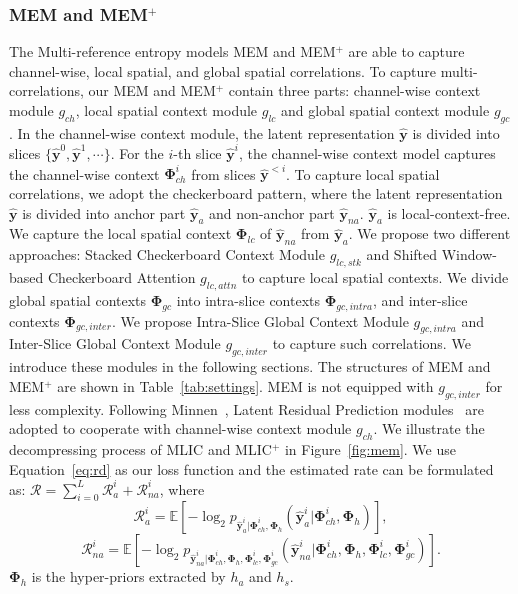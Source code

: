 \documentclass[sigconf]{acmart}
\begin{document}
\subsubsection{MEM and MEM$^+$}
The Multi-reference entropy models MEM and MEM$^+$ are able to
capture channel-wise, local spatial, and global spatial correlations.
To capture multi-correlations, our MEM and MEM$^+$ contain three parts:
channel-wise context module $g_{ch}$, local spatial context module $g_{lc}$ and
global spatial context module $g_{gc}$.
In the channel-wise context module, the latent representation $\hat{\boldsymbol{y}}$
is divided into slices $\{\hat {\boldsymbol{y}}^0, \hat {\boldsymbol{y}}^1, \cdots\}$.
For the $i$-th slice $\hat {\boldsymbol{y}}^i$, the channel-wise context model captures
the channel-wise context $\boldsymbol{\Phi}_{ch}^i$ from slices $\hat {\boldsymbol{y}}^{<i}$.
To capture local spatial correlations, we adopt the checkerboard pattern, where
the latent representation $\hat{\boldsymbol{y}}$ is divided into
anchor part $\hat{\boldsymbol{y}}_a$ and non-anchor part $\hat{\boldsymbol{y}}_{na}$.
$\hat{\boldsymbol{y}}_a$ is local-context-free.
We capture the local spatial context ${\boldsymbol{\Phi}}_{lc}$ of
$\hat{\boldsymbol{y}}_{na}$ from $\hat{\boldsymbol{y}}_{a}$.
We propose two different approaches:
Stacked Checkerboard Context Module $g_{lc, stk}$ and
Shifted Window-based Checkerboard Attention $g_{lc, attn}$ to capture local spatial contexts.
We divide global spatial contexts $\boldsymbol{\Phi}_{gc}$ into
intra-slice contexts $\boldsymbol{\Phi}_{gc, intra}$, and inter-slice contexts $\boldsymbol{\Phi}_{gc, inter}$.
We propose Intra-Slice Global Context Module $g_{gc, intra}$ and
Inter-Slice Global Context Module $g_{gc, inter}$ to capture such correlations.
We introduce these modules in the following sections.
The structures of MEM and MEM$^+$ are shown in Table~\ref{tab:settings}.
MEM is not equipped with $g_{gc, inter}$ for less complexity.
Following Minnen~\cite{DBLP:conf/icip/MinnenS20},
Latent Residual Prediction modules~\cite{DBLP:conf/icip/MinnenS20} are adopted
to cooperate with channel-wise context module $g_{ch}$.
We illustrate the decompressing process of MLIC and MLIC$^+$ in Figure~\ref{fig:mem}.
We use Equation~\ref{eq:rd} as our loss function
and the estimated rate can be formulated as:
$\mathcal{R} = \sum^L_{i=0} \mathcal{R}_a^i + \mathcal{R}_{na}^i$, where
\begin{equation}
        \mathcal{R}_a^i = \mathbb{E}[-\log_2p_{\hat {\boldsymbol{y}}^i_a | {\boldsymbol{\Phi}}_{ch}^i, {\boldsymbol{\Phi}}_{h}}(\hat {\boldsymbol{y}}^i_a | {\boldsymbol{\Phi}}_{ch}^i, {\boldsymbol{\Phi}}_{h})],
\end{equation}
\begin{equation}
        \mathcal{R}_{na}^i = \mathbb{E}[-\log_2p_{\hat {\boldsymbol{y}}^i_{na} | {\boldsymbol{\Phi}}_{ch}^i, {\boldsymbol{\Phi}}_{h}, {\boldsymbol{\Phi}}_{lc}^i, {\boldsymbol{\Phi}}_{gc}^i}(\hat {\boldsymbol{y}}^i_{na} | {\boldsymbol{\Phi}}_{ch}^i, {\boldsymbol{\Phi}}_{h}, {\boldsymbol{\Phi}}_{lc}^i, {\boldsymbol{\Phi}}_{gc}^i)].
\end{equation}
$\boldsymbol{\Phi}_{h}$ is the hyper-priors extracted by $h_a$ and $h_s$.
\end{document}
